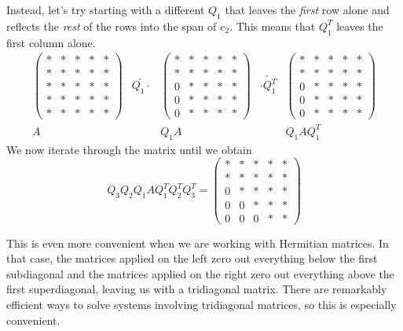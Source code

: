 Instead, let's try starting with a different $Q_1$ that leaves the \emph{first} row alone and reflects the \emph{rest} of the rows into the span of $e_2$. This means that $Q_1^T$ leaves the first column alone.
\[
\begin{array}{ccccc}
\begin{pmatrix}
* & * & * & * & * \\
* & * & * & * & * \\
* & * & * & * & * \\
* & * & * & * & * \\
* & * & * & * & *
\end{pmatrix}
&\underrightarrow{Q_1 \cdot }&
\begin{pmatrix}
* & * & * & * & * \\
* & * & * & * & * \\
0 & * & * & * & * \\
0 & * & * & * & * \\
0 & * & * & * & *
\end{pmatrix}
&\underrightarrow{\cdot Q_1^T }&
\begin{pmatrix}
* & * & * & * & * \\
* & * & * & * & * \\
0 & * & * & * & * \\
0 & * & * & * & * \\
0 & * & * & * & *
\end{pmatrix}
\\
A & & Q_1A & & Q_1 A Q_1^T
  \end{array}
\]
We now iterate through the matrix until we obtain
\begin{equation*}
Q_3 Q_2 Q_1 A Q_1^T Q_2 ^T Q_3^T =
\begin{pmatrix}
* & * & * & * & * \\
* & * & * & * & * \\
0 & * & * & * & * \\
0 & 0 & * & * & * \\
0 & 0 & 0 & * & *
\end{pmatrix}
\end{equation*}

This is even more convenient when we are working with Hermitian matrices.
In that case, the matrices applied on the left zero out everything below the first subdiagonal and the matrices applied on the right zero out everything above the first superdiagonal, leaving us with a tridiagonal matrix.
There are remarkably efficient ways to solve systems involving tridiagonal matrices, so this is especially convenient.

